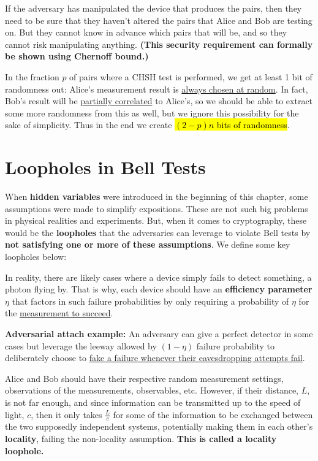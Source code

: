 \documentclass[12pt]{article}
\begin{document}
\begin{remark}
If the adversary has manipulated the device that produces the pairs, then they need to be sure that they haven’t altered the pairs that Alice and Bob are testing on. But they cannot know in advance which pairs that will be, and so they cannot risk manipulating anything. \textbf{(This security requirement can formally be shown using Chernoff bound.)}
\end{remark}

\begin{remark}
In the fraction $p$ of pairs where a CHSH test is performed, we get at least 1 bit of randomness out: Alice’s measurement result is \underline{always chosen at random}. In fact, Bob’s result will be \underline{partially correlated} to Alice’s, so we should be able to extract some more randomness from this as well, but we ignore this possibility for the sake of simplicity. Thus in the end we create \hl{$(2 - p)n$ bits of randomness}.
\end{remark}

\section{Loopholes in Bell Tests}
When \textbf{hidden variables} were introduced in the beginning of this chapter, some assumptions were made to simplify expositions. These are not such big problems in physical realities and experiments. But, when it comes to cryptography, these would be the \textbf{loopholes} that the adversaries can leverage to violate Bell tests by \textbf{not satisfying one or more of these assumptions}. We define some key loopholes below:

\begin{definition}
In reality, there are likely cases where a device simply fails to detect something, \eg a photon flying by. That is why, each device should have an \textbf{efficiency parameter $\eta$} that factors in such failure probabilities by only requiring a probability of $\eta$ for the \underline{measurement to succeed}.

\noindent \textbf{Adversarial attach example:} An adversary can give a perfect detector in some cases but leverage the leeway allowed by $(1-\eta)$ failure probability to deliberately choose to \underline{fake a failure whenever their eavesdropping attempts fail}.
\end{definition}

\begin{definition}
Alice and Bob should have their respective random measurement settings, observations of the measurements, observables, etc. However, if their distance, $L$, is not far enough, and since information can be transmitted up to the speed of light, $c$, then it only takes \underline{$\frac{L}{c}$} for some of the information to be exchanged between the two supposedly independent systems, potentially making them in each other's \textbf{locality}, failing the non-locality assumption. \textbf{This is called a locality loophole.}
\end{definition}
\end{document}
